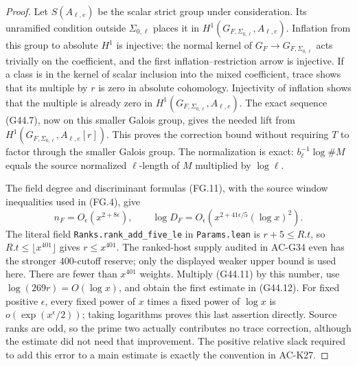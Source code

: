 \begin{proof}
Let $S(A_{\ell,e})$ be the scalar strict group under
consideration.  Its unramified condition outside
$\Sigma_{0,\ell}$ places it in
$H^1(G_{F,\Sigma_{0,\ell}},A_{\ell,e})$.
Inflation from this group to absolute $H^1$ is injective:
the normal kernel of $G_F\to G_{F,\Sigma_{0,\ell}}$
acts trivially on the coefficient, and the first
inflation--restriction arrow is injective.
If a class is in the kernel of scalar inclusion into
the mixed coefficient, trace shows that its multiple
by $r$ is zero in absolute cohomology.  Injectivity of
inflation shows that the multiple is already zero in
$H^1(G_{F,\Sigma_{0,\ell}},A_{\ell,e})$.
The exact sequence (G44.7), now on this smaller Galois
group, gives the needed lift from
$H^1(G_{F,\Sigma_{0,\ell}},A_{\ell,e}[r])$.
This proves the correction bound without requiring $T$
to factor through the smaller Galois group.
The normalization is exact:
$b_\ell^{-1}\log\#M$ equals the source normalized
$\ell$-length of $M$ multiplied by $\log\ell$.

The field degree and discriminant formulas (FG.11),
with the source window inequalities used in (FG.4), give
\[
 n_F=O_\epsilon(x^{2+8\epsilon}),\qquad
 \log D_F=O_\epsilon
       (x^{2+41\epsilon/5}(\log x)^2).
\]
The literal field \texttt{Ranks.rank\_add\_five\_le} in
\texttt{Params.lean} is $r+5\le R.t$, so
$R.t\le\lfloor x^{401}\rfloor$ gives $r\le x^{401}$.
The ranked-host supply audited in AC-G34 even has the
stronger $400$-cutoff reserve; only the displayed weaker
upper bound is used here.
There are fewer than $x^{401}$ weights.
Multiply (G44.11) by this number, use
$\log(269r)=O(\log x)$, and obtain the first estimate
in (G44.12).  For fixed positive $\epsilon$, every fixed
power of $x$ times a fixed power of $\log x$ is
$o(\exp(x^\epsilon/2))$; taking logarithms proves this
last assertion directly.  Source ranks are odd, so the
prime two actually contributes no trace correction,
although the estimate did not need that improvement.
The positive relative slack required to add this error
to a main estimate is exactly the convention in AC-K27.
\end{proof}

